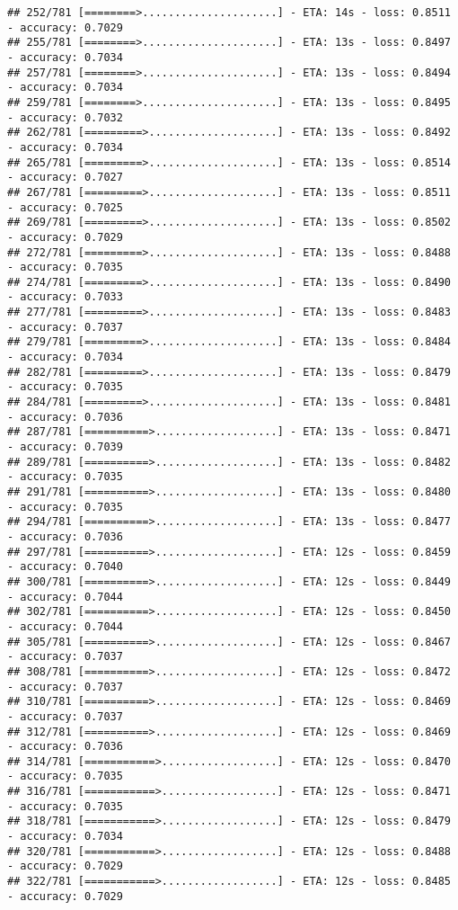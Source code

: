 \documentclass[
]{article}
\begin{document}
\begin{verbatim}
## 252/781 [========>.....................] - ETA: 14s - loss: 0.8511 - accuracy: 0.7029
## 255/781 [========>.....................] - ETA: 13s - loss: 0.8497 - accuracy: 0.7034
## 257/781 [========>.....................] - ETA: 13s - loss: 0.8494 - accuracy: 0.7034
## 259/781 [========>.....................] - ETA: 13s - loss: 0.8495 - accuracy: 0.7032
## 262/781 [=========>....................] - ETA: 13s - loss: 0.8492 - accuracy: 0.7034
## 265/781 [=========>....................] - ETA: 13s - loss: 0.8514 - accuracy: 0.7027
## 267/781 [=========>....................] - ETA: 13s - loss: 0.8511 - accuracy: 0.7025
## 269/781 [=========>....................] - ETA: 13s - loss: 0.8502 - accuracy: 0.7029
## 272/781 [=========>....................] - ETA: 13s - loss: 0.8488 - accuracy: 0.7035
## 274/781 [=========>....................] - ETA: 13s - loss: 0.8490 - accuracy: 0.7033
## 277/781 [=========>....................] - ETA: 13s - loss: 0.8483 - accuracy: 0.7037
## 279/781 [=========>....................] - ETA: 13s - loss: 0.8484 - accuracy: 0.7034
## 282/781 [=========>....................] - ETA: 13s - loss: 0.8479 - accuracy: 0.7035
## 284/781 [=========>....................] - ETA: 13s - loss: 0.8481 - accuracy: 0.7036
## 287/781 [==========>...................] - ETA: 13s - loss: 0.8471 - accuracy: 0.7039
## 289/781 [==========>...................] - ETA: 13s - loss: 0.8482 - accuracy: 0.7035
## 291/781 [==========>...................] - ETA: 13s - loss: 0.8480 - accuracy: 0.7035
## 294/781 [==========>...................] - ETA: 13s - loss: 0.8477 - accuracy: 0.7036
## 297/781 [==========>...................] - ETA: 12s - loss: 0.8459 - accuracy: 0.7040
## 300/781 [==========>...................] - ETA: 12s - loss: 0.8449 - accuracy: 0.7044
## 302/781 [==========>...................] - ETA: 12s - loss: 0.8450 - accuracy: 0.7044
## 305/781 [==========>...................] - ETA: 12s - loss: 0.8467 - accuracy: 0.7037
## 308/781 [==========>...................] - ETA: 12s - loss: 0.8472 - accuracy: 0.7037
## 310/781 [==========>...................] - ETA: 12s - loss: 0.8469 - accuracy: 0.7037
## 312/781 [==========>...................] - ETA: 12s - loss: 0.8469 - accuracy: 0.7036
## 314/781 [===========>..................] - ETA: 12s - loss: 0.8470 - accuracy: 0.7035
## 316/781 [===========>..................] - ETA: 12s - loss: 0.8471 - accuracy: 0.7035
## 318/781 [===========>..................] - ETA: 12s - loss: 0.8479 - accuracy: 0.7034
## 320/781 [===========>..................] - ETA: 12s - loss: 0.8488 - accuracy: 0.7029
## 322/781 [===========>..................] - ETA: 12s - loss: 0.8485 - accuracy: 0.7029

\end{verbatim}
\end{document}
